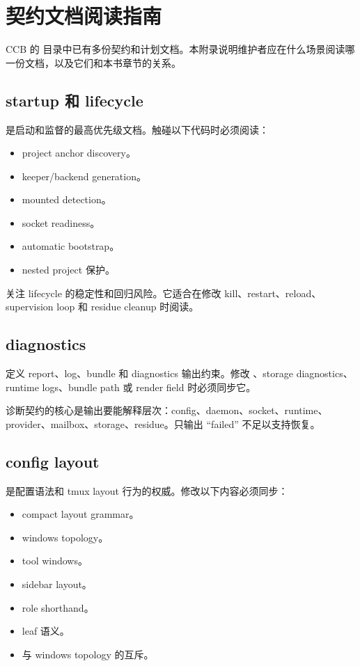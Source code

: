 \chapter{契约文档阅读指南}

CCB 的  目录中已有多份契约和计划文档。本附录说明维护者应在什么场景阅读哪一份文档，以及它们和本书章节的关系。

\section{startup 和 lifecycle}

 是启动和监督的最高优先级文档。触碰以下代码时必须阅读：

\begin{itemize}
  \item project anchor discovery。
  \item keeper/backend generation。
  \item mounted detection。
  \item socket readiness。
  \item automatic bootstrap。
  \item nested project 保护。
\end{itemize}

 关注 lifecycle 的稳定性和回归风险。它适合在修改 kill、restart、reload、supervision loop 和 residue cleanup 时阅读。

\section{diagnostics}

 定义 report、log、bundle 和 diagnostics 输出约束。修改 、storage diagnostics、runtime logs、bundle path 或 render field 时必须同步它。

诊断契约的核心是输出要能解释层次：config、daemon、socket、runtime、provider、mailbox、storage、residue。只输出 “failed” 不足以支持恢复。

\section{config layout}

 是配置语法和 tmux layout 行为的权威。修改以下内容必须同步：

\begin{itemize}
  \item compact layout grammar。
  \item windows topology。
  \item tool windows。
  \item sidebar layout。
  \item role shorthand。
  \item {} leaf 语义。
  \item {} 与 windows topology 的互斥。
\end{itemize}

